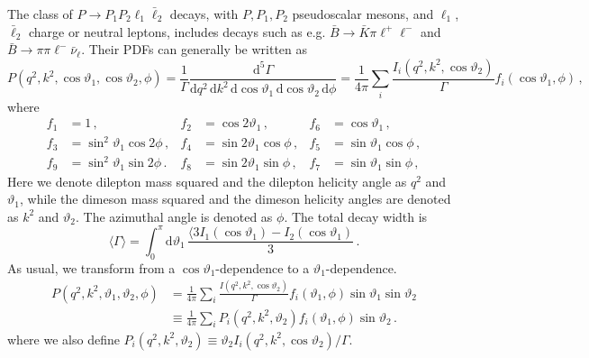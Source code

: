 \documentclass[aps,prd,reprint,nofootinbib,preprintnumbers]{revtex4}
\newcommand{\dd}{\text{d}}
\renewcommand{\theta}{\vartheta}
\begin{document}
The class of $P\to P_1 P_2 \ell_1\bar\ell_2$ decays, with $P,P_1,P_2$ pseudoscalar mesons,
and $\ell_1$, $\bar\ell_2$ charge or neutral leptons, includes decays
such as e.g. $\bar{B}\to\bar{K}\pi\ell^+\ell^-$ and $\bar{B}\to \pi\pi\ell^-\bar\nu_\ell$.
Their PDFs can generally be written as \cite{Lee:1992ih}
\begin{equation}
    P(q^2, k^2, \cos\theta_1, \cos \theta_2, \phi) = \frac{1}{\Gamma}\frac{\dd^5 \Gamma}{\dd q^2\,\dd k^2\, \dd\cos\theta_1\,\dd\cos\theta_2\,\dd\phi} = \frac{1}{4\pi} \sum_i \frac{I_i(q^2, k^2, \cos\theta_2)}{\Gamma} f_i(\cos\theta_1,\phi)\,,
\end{equation}
where
\begin{equation}
\begin{aligned}
    f_1 & = 1\,,              &
    f_2 & = \cos 2\theta_1\,, &
    f_6 & = \cos  \theta_1\,, \\
    f_3 & = \sin^2\theta_1 \cos 2\phi\,,&
    f_4 & = \sin 2\theta_1 \cos  \phi\,,&
    f_5 & = \sin  \theta_1 \cos  \phi\,,\\
    f_9 & = \sin^2\theta_1 \sin 2\phi\,.&
    f_8 & = \sin 2\theta_1 \sin  \phi\,,&
    f_7 & = \sin  \theta_1 \sin  \phi\,,
\end{aligned}
\end{equation}
Here we denote dilepton mass squared and the dilepton helicity angle as $q^2$ and $\theta_1$, while
the dimeson mass squared and the dimeson helicity angles are denoted as $k^2$ and $\theta_2$. The
azimuthal angle is denoted as $\phi$. The total decay width is
\begin{equation}
    \langle \Gamma\rangle = \int_0^\pi \dd\theta_1\,\frac{\langle 3I_1(\cos\theta_1) - I_2(\cos\theta_1)}{3}\,.
\end{equation}
As usual, we transform from a $\cos\theta_1$-dependence to a $\theta_1$-dependence.
\begin{equation}
\begin{aligned}
    P(q^2, k^2, \theta_1, \theta_2, \phi)
    & = \frac{1}{4\pi} \sum_i \frac{I(q^2, k^2, \cos\theta_2)}{\Gamma} f_i(\theta_1, \phi) \sin\theta_1 \sin\theta_2\\
    & \equiv \frac{1}{4\pi} \sum_i P_i(q^2, k^2, \theta_2) f_i(\theta_1, \phi) \sin\theta_2\,.
\end{aligned}
\end{equation}
where we also define $P_i(q^2, k^2, \theta_2) \equiv \theta_2 I_i(q^2, k^2, \cos\theta_2) / \Gamma$.\\
\end{document}
